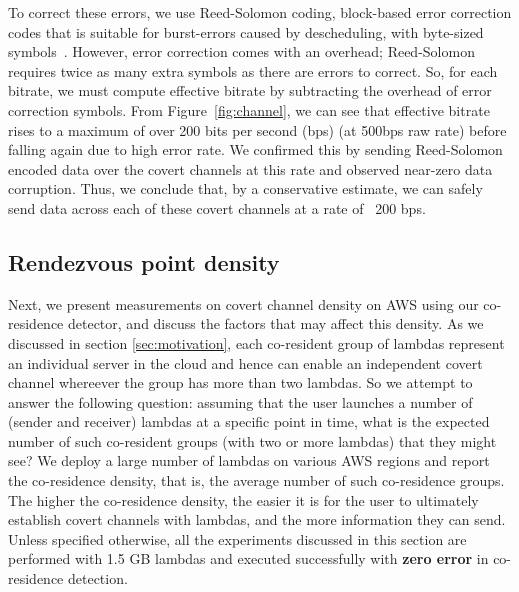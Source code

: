 To correct these errors, we use Reed-Solomon coding, block-based error correction 
codes that is suitable for burst-errors caused by descheduling, with byte-sized 
symbols~\cite{wuusenix2012}. However, error correction comes with an overhead; 
Reed-Solomon requires twice as
many extra symbols as there are errors to correct. So, for each bitrate, we must compute
effective bitrate by subtracting the overhead of error correction symbols.
From Figure~\ref{fig:channel}, we can see that effective bitrate rises to a
maximum of over 200 bits per second (bps) (at 500bps raw rate) before falling
again due to high error rate. We confirmed this by sending Reed-Solomon encoded
data over the covert channels at this rate and observed near-zero data
corruption. Thus, we conclude that, by a conservative estimate, we can safely
send data across each of these covert channels at a rate of ~200 bps.

\subsection{Rendezvous point density}
Next, we present measurements on covert channel density on AWS using our
co-residence detector, and discuss the factors that may affect this density.  As
we discussed in section \ref{sec:motivation}, each co-resident group of lambdas 
represent an individual server in the cloud and hence can enable an independent 
covert channel whereever the group has more than two lambdas. So we attempt to answer 
the following question: assuming that the user launches a number of
(sender and receiver) lambdas at a specific point in time, what is the expected
number of such co-resident groups (with two or more lambdas) that they might see? 
We deploy a large number of lambdas on various AWS regions and report the co-residence 
density, that is, the average number of such co-residence groups. The higher the 
co-residence density, the easier it is for the user
to ultimately establish covert channels with lambdas, and the more information
they can send. Unless specified otherwise, all the experiments discussed in this
section are performed with 1.5 GB lambdas and executed successfully with
\textbf{zero error} in co-residence detection.


